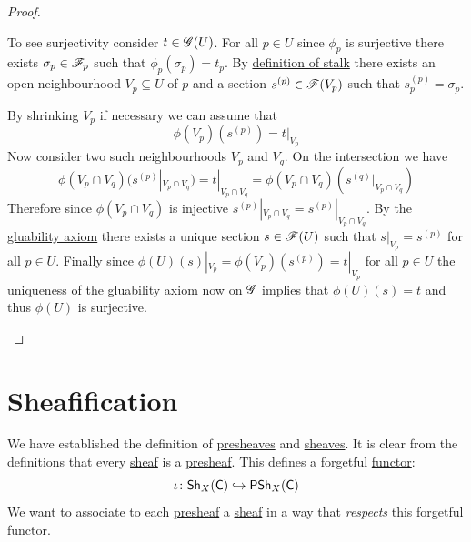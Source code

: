 \documentclass[../../main]{subfiles}
\begin{document}
\begin{proof}
\begin{itemize}
          To see surjectivity consider \(t \in \mathscr{G}(U)\).
          For all \(p \in U\) since \(\phi_{p}\) is surjective there exists \(\sigma_{p} \in \mathscr{F}_{p}\) such that \(\phi_{p}(\sigma_{p}) = t_{p}\).
          By \hyperref[def:stalk]{definition of stalk} there exists an open neighbourhood \(V_{p} \subseteq U\) of \(p\) and a section \(s^{(p)} \in \mathscr{F}(V_{p})\) such that \(s_{p}^{(p)} = \sigma_{p}\).

          By shrinking \(V_{p}\) if necessary we can assume that
          \begin{equation*}
            \phi(V_{p})(s^{(p)}) = t|_{V_{p}}
          \end{equation*}
          Now consider two such neighbourhoods \(V_{p}\) and \(V_{q}\).
          On the intersection we have
          \begin{equation*}
            \phi(V_{p} \cap V_{q})(s^{(p)}|_{V_{p} \cap V_{q}}) = t|_{V_{p} \cap V_{q}} = \phi(V_{p} \cap V_{q})(s^{(q)}|_{V_{p} \cap V_{q}})
          \end{equation*}
          Therefore since \(\phi(V_{p} \cap V_{q})\) is injective \(s^{(p)}|_{V_{p} \cap V_{q}} = s^{(p)}|_{V_{p} \cap V_{q}}\).
          By the \hyperref[axiom:sheaf-gluability]{gluability axiom} there exists a unique section \(s \in \mathscr{F}(U)\) such that \(s|_{V_{p}} = s^{(p)}\) for all \(p \in U\).
          Finally since \(\phi(U)(s)|_{V_{p}} = \phi(V_{p})(s^{(p)}) = t|_{V_{p}}\) for all \(p \in U\) the uniqueness of the \hyperref[axiom:sheaf-gluability]{gluability axiom} now on \(\mathscr{G}\) implies that \(\phi(U)(s) = t\) and thus \(\phi(U)\) is surjective. \qedhere
  \end{itemize}
\end{proof}



\section{Sheafification}

We have established the definition of \hyperref[def:presheaf]{presheaves} and \hyperref[def:sheaf]{sheaves}. It is clear from the definitions that every \hyperref[def:sheaf]{sheaf} is a \hyperref[def:presheaf]{presheaf}. This defines a forgetful \hyperref[def:functor]{functor}:
\begin{equation*}
    \iota\colon \mathsf{Sh}_{X}(\mathsf{C}) \hookrightarrow \mathsf{PSh}_{X}(\mathsf{C})
\end{equation*}
We want to associate to each \hyperref[def:presheaf]{presheaf} a \hyperref[def:sheaf]{sheaf} in a way that \textit{respects} this forgetful functor.
\end{document}
